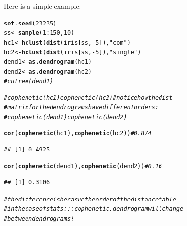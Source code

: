 \documentclass[shortnames,nojss,article]{jss}\usepackage[]{graphicx}\usepackage[]{color}
\makeatletter
\newcommand{\hlnum}[1]{\textcolor[rgb]{0.686,0.059,0.569}{#1}}%
\newcommand{\hlstr}[1]{\textcolor[rgb]{0.192,0.494,0.8}{#1}}%
\newcommand{\hlcom}[1]{\textcolor[rgb]{0.678,0.584,0.686}{\textit{#1}}}%
\newcommand{\hlopt}[1]{\textcolor[rgb]{0,0,0}{#1}}%
\newcommand{\hlstd}[1]{\textcolor[rgb]{0.345,0.345,0.345}{#1}}%
\newcommand{\hlkwb}[1]{\textcolor[rgb]{0.69,0.353,0.396}{#1}}%
\newcommand{\hlkwd}[1]{\textcolor[rgb]{0.737,0.353,0.396}{\textbf{#1}}}%
\newenvironment{kframe}{%
 \def\at@end@of@kframe{}%
 \ifinner\ifhmode%
  \def\at@end@of@kframe{\end{minipage}}%
  \begin{minipage}{\columnwidth}%
 \fi\fi%
 \def\FrameCommand##1{\hskip\@totalleftmargin \hskip-\fboxsep
 \colorbox{shadecolor}{##1}\hskip-\fboxsep
     \hskip-\linewidth \hskip-\@totalleftmargin \hskip\columnwidth}%
 \MakeFramed {\advance\hsize-\width
   \@totalleftmargin\z@ \linewidth\hsize
   \@setminipage}}%
 {\par\unskip\endMakeFramed%
 \at@end@of@kframe}
\newenvironment{knitrout}{}{} %
\makeatother
\begin{document}
Here is a simple example:

\begin{knitrout}
\color{fgcolor}\begin{kframe}
\begin{alltt}
\hlkwd{set.seed}\hlstd{(}\hlnum{23235}\hlstd{)}
\hlstd{ss} \hlkwb{<-} \hlkwd{sample}\hlstd{(}\hlnum{1}\hlopt{:}\hlnum{150}\hlstd{,} \hlnum{10}\hlstd{)}
\hlstd{hc1} \hlkwb{<-} \hlkwd{hclust}\hlstd{(}\hlkwd{dist}\hlstd{(iris[ss,} \hlopt{-}\hlnum{5}\hlstd{]),} \hlstr{"com"}\hlstd{)}
\hlstd{hc2} \hlkwb{<-} \hlkwd{hclust}\hlstd{(}\hlkwd{dist}\hlstd{(iris[ss,} \hlopt{-}\hlnum{5}\hlstd{]),} \hlstr{"single"}\hlstd{)}
\hlstd{dend1} \hlkwb{<-} \hlkwd{as.dendrogram}\hlstd{(hc1)}
\hlstd{dend2} \hlkwb{<-} \hlkwd{as.dendrogram}\hlstd{(hc2)}
\hlcom{# cutree(dend1)}

\hlcom{# cophenetic(hc1) cophenetic(hc2) # notice how the dist}
\hlcom{# matrix for the dendrograms have different orders:}
\hlcom{# cophenetic(dend1) cophenetic(dend2)}

\hlkwd{cor}\hlstd{(}\hlkwd{cophenetic}\hlstd{(hc1),} \hlkwd{cophenetic}\hlstd{(hc2))}  \hlcom{# 0.874}
\end{alltt}
\begin{verbatim}
## [1] 0.4925
\end{verbatim}
\begin{alltt}
\hlkwd{cor}\hlstd{(}\hlkwd{cophenetic}\hlstd{(dend1),} \hlkwd{cophenetic}\hlstd{(dend2))}  \hlcom{# 0.16}
\end{alltt}
\begin{verbatim}
## [1] 0.3106
\end{verbatim}
\begin{alltt}
\hlcom{# the difference is becasue the order of the distance table}
\hlcom{# in the case of stats:::cophenetic.dendrogram will change}
\hlcom{# between dendrograms!}


\end{alltt}
\end{kframe}
\end{knitrout}
\end{document}
